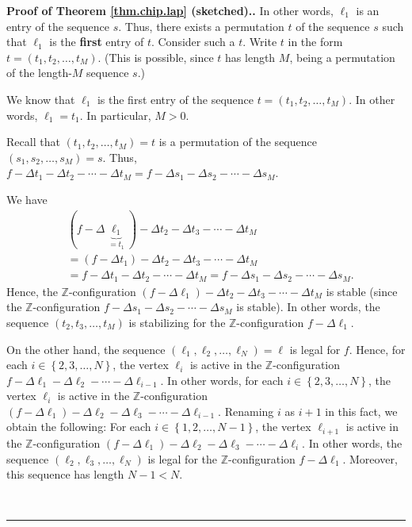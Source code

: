 \documentclass[numbers=enddot,12pt,final,onecolumn,notitlepage]{scrartcl}%
\theoremstyle{definition}
\newenvironment{proof}[1][Proof]{\noindent\textbf{#1.} }{\ \rule{0.5em}{0.5em}}
\newcommand{\ZZ}{\mathbb{Z}}
\begin{document}
\begin{proof}[Proof of Theorem \ref{thm.chip.lap} (sketched).]
In other words, $\ell_{1}$ is an entry of the sequence $s$. Thus, there exists
a permutation $t$ of the sequence $s$ such that $\ell_{1}$ is the
\textbf{first} entry of $t$. Consider such a $t$. Write $t$ in the form
$t=\left(  t_{1},t_{2},\ldots,t_{M}\right)  $. (This is possible, since $t$
has length $M$, being a permutation of the length-$M$ sequence $s$.)

We know that $\ell_{1}$ is the first entry of the sequence $t=\left(
t_{1},t_{2},\ldots,t_{M}\right)  $. In other words, $\ell_{1}=t_{1}$. In
particular, $M>0$.

Recall that $\left(  t_{1},t_{2},\ldots,t_{M}\right)  =t$ is a permutation of
the sequence $\left(  s_{1},s_{2},\ldots,s_{M}\right)  =s$. Thus, $f-\Delta
t_{1}-\Delta t_{2}-\cdots-\Delta t_{M}=f-\Delta s_{1}-\Delta s_{2}%
-\cdots-\Delta s_{M}$.

We have
\begin{align*}
& \left(  f-\Delta\underbrace{\ell_{1}}_{=t_{1}}\right)  -\Delta t_{2}-\Delta
t_{3}-\cdots-\Delta t_{M}\\
& =\left(  f-\Delta t_{1}\right)  -\Delta t_{2}-\Delta t_{3}-\cdots-\Delta
t_{M}\\
& =f-\Delta t_{1}-\Delta t_{2}-\cdots-\Delta t_{M}=f-\Delta s_{1}-\Delta
s_{2}-\cdots-\Delta s_{M}.
\end{align*}
Hence, the $\ZZ$-configuration $\left(  f-\Delta\ell_{1}\right)
-\Delta t_{2}-\Delta t_{3}-\cdots-\Delta t_{M}$ is stable (since the
$\ZZ$-configuration $f-\Delta s_{1}-\Delta s_{2}-\cdots-\Delta s_{M}$
is stable). In other words, the sequence $\left(  t_{2},t_{3},\ldots
,t_{M}\right)  $ is stabilizing for the $\ZZ$-configuration
$f-\Delta\ell_{1}$.

On the other hand, the sequence $\left(  \ell_{1},\ell_{2},\ldots,\ell
_{N}\right)  =\ell$ is legal for $f$. Hence, for each $i\in\left\{
2,3,\ldots,N\right\}  $, the vertex $\ell_{i}$ is active in the $\ZZ%
$-configuration $f-\Delta\ell_{1}-\Delta\ell_{2}-\cdots-\Delta\ell_{i-1}$. In
other words, for each $i\in\left\{  2,3,\ldots,N\right\}  $, the vertex
$\ell_{i}$ is active in the $\ZZ$-configuration $\left(  f-\Delta
\ell_{1}\right)  -\Delta\ell_{2}-\Delta\ell_{3}-\cdots-\Delta\ell_{i-1}$.
Renaming $i$ as $i+1$ in this fact, we obtain the following: For each
$i\in\left\{  1,2,\ldots,N-1\right\}  $, the vertex $\ell_{i+1}$ is active in
the $\ZZ$-configuration $\left(  f-\Delta\ell_{1}\right)  -\Delta
\ell_{2}-\Delta\ell_{3}-\cdots-\Delta\ell_{i}$. In other words, the sequence
$\left(  \ell_{2},\ell_{3},\ldots,\ell_{N}\right)  $ is legal for the
$\ZZ$-configuration $f-\Delta\ell_{1}$. Moreover, this sequence has
length $N-1<N$.


\end{proof}
\end{document}
